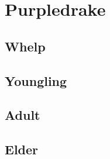 \section{Purpledrake}

\subsection{Whelp}

\subsection{Youngling}

\subsection{Adult}

\subsection{Elder}